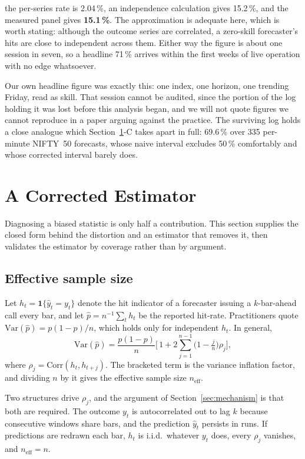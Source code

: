 \documentclass[conference]{IEEEtran}
\begin{document}
the per-series rate is 2.04\,\%, an independence calculation gives 15.2\,\%, and
the measured panel gives \textbf{15.1\,\%}. The approximation is adequate here,
which is worth stating: although the outcome series are correlated, a zero-skill
forecaster's hits are close to independent across them. Either way the figure is
about one session in seven, so a headline 71\,\% arrives within the first weeks
of live operation with no edge whatsoever.

Our own headline figure was exactly this: one index, one horizon, one trending
Friday, read as skill. That session cannot be audited, since the portion of the
log holding it was lost before this analysis began, and we will not quote
figures we cannot reproduce in a paper arguing against the practice. The
surviving log holds a close analogue which Section~\ref{sec:estimator}-C takes
apart in full: 69.6\,\% over 335 per-minute NIFTY~50 forecasts, whose naive
interval excludes 50\,\% comfortably and whose corrected interval barely does.

\section{A Corrected Estimator}
\label{sec:estimator}

Diagnosing a biased statistic is only half a contribution. This section supplies
the closed form behind the distortion and an estimator that removes it, then
validates the estimator by coverage rather than by argument.

\subsection{Effective sample size}

Let $h_t = \mathbf{1}\{\hat{y}_t = y_t\}$ denote the hit indicator of a
forecaster issuing a $k$-bar-ahead call every bar, and let
$\hat{p} = n^{-1}\sum_t h_t$ be the reported hit-rate. Practitioners quote
$\mathrm{Var}(\hat{p}) = p(1-p)/n$, which holds only for independent $h_t$. In
general,
\begin{equation}
\mathrm{Var}(\hat{p}) = \frac{p(1-p)}{n}
\Big[\,1 + 2\sum_{j=1}^{n-1}\Big(1 - \tfrac{j}{n}\Big)\rho_j\Big],
\label{eq:var}
\end{equation}
where $\rho_j = \mathrm{Corr}(h_t, h_{t+j})$. The bracketed term is the variance
inflation factor, and dividing $n$ by it gives the effective sample size
$n_{\text{eff}}$.

Two structures drive $\rho_j$, and the argument of
Section~\ref{sec:mechanism} is that both are required. The outcome $y_t$ is
autocorrelated out to lag $k$ because consecutive windows share bars, and the
prediction $\hat{y}_t$ persists in runs. If predictions are redrawn each bar,
$h_t$ is i.i.d.\ whatever $y_t$ does, every $\rho_j$ vanishes, and
$n_{\text{eff}} = n$.
\end{document}
